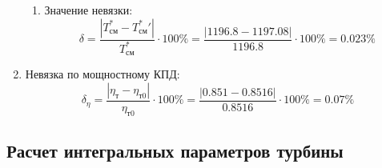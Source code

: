 \documentclass[a4paper,10pt]{article}
\begin{document}
\begin{enumerate}
\begin{enumerate}
            \item Значение невязки:
            \[
                \delta = \frac{ \left| T_{см}^{*} - T_{см}^*\prime \right| }{T_{см}^{*}} \cdot 100 \% =
                    \frac{
                        \left| 1196.8 - 1197.08 \right|
                    }{
                        1196.8
                    } \cdot 100 \% =
                0.023 \%
            \]

        \end{enumerate}

        

        \item Невязка по мощностному КПД:
        \[
            \delta_\eta = \frac{ \left| \eta_т - \eta_{т0} \right| }{ \eta_{т0} } \cdot 100 \% =
                \frac{
                    \left| 0.851 - 0.8516 \right|
                }{
                    0.8516 } \cdot 100 \% =
            0.07 \%
        \]

    \end{enumerate}
     

    \subsection{Расчет интегральных параметров турбины}

    
\end{document}
